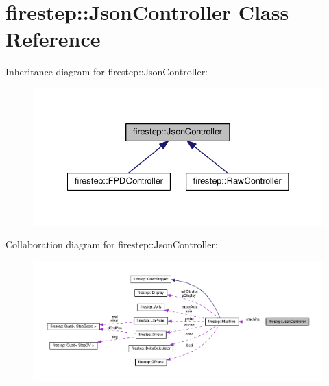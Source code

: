 \hypertarget{classfirestep_1_1_json_controller}{\section{firestep\+:\+:Json\+Controller Class Reference}
\label{classfirestep_1_1_json_controller}
}


Inheritance diagram for firestep\+:\+:Json\+Controller\+:
\nopagebreak
\begin{figure}[H]
\begin{center}
\leavevmode
\includegraphics[width=331pt]{classfirestep_1_1_json_controller__inherit__graph}
\end{center}
\end{figure}


Collaboration diagram for firestep\+:\+:Json\+Controller\+:
\nopagebreak
\begin{figure}[H]
\begin{center}
\leavevmode
\includegraphics[width=350pt]{classfirestep_1_1_json_controller__coll__graph}
\end{center}
\end{figure}
